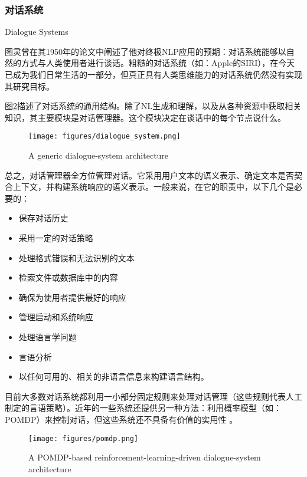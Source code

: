 \subsubsection{对话系统}{Dialogue Systems}

图灵曾在其1950年的论文中阐述了他对终极NLP应用的预期：对话系统能够以自然的方式与人类使用者进行谈话。粗糙的对话系统（如：Apple的SIRI），在今天已成为我们日常生活的一部分，但真正具有人类思维能力的对话系统仍然没有实现其研究目标。

图\ref{fig:dialogue}描述了对话系统的通用结构\cite{Arora2013}。除了NL生成和理解，以及从各种资源中获取相关知识，其主要模块是对话管理器。这个模块决定在谈话中的每个节点说什么。

\begin{figure}[htb]
\centering
\texttt{[image: figures/dialogue\_system.png]}
\caption{ A generic dialogue-system architecture }
\label{fig:dialogue}
\end{figure}

总之，对话管理器全方位管理对话。它采用用户文本的语义表示、确定文本是否契合上下文，并构建系统响应的语义表示。一般来说，在它的职责中，以下几个是必要的：

\begin{itemize}
\item 保存对话历史
\item 采用一定的对话策略
\item 处理格式错误和无法识别的文本
\item 检索文件或数据库中的内容
\item 确保为使用者提供最好的响应
\item 管理启动和系统响应
\item 处理语言学问题
\item 言语分析
\item 以任何可用的、相关的非语言信息来构建语言结构。
\end{itemize}

目前大多数对话系统都利用一小部分固定规则来处理对话管理（这些规则代表人工制定的言语策略）。近年的一些系统还提供另一种方法：利用概率模型（如：POMDP）来控制对话，但这些系统还不具备有价值的实用性\cite{Young2006} \cite{Williams2010}。

\begin{figure}[htb]
\centering
\texttt{[image: figures/pomdp.png]}
\caption{ A POMDP-based reinforcement-learning-driven dialogue-system architecture }
\label{fig:dialogue}
\end{figure}



